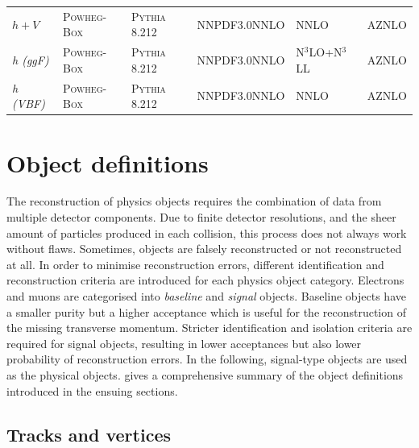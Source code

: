 \begin{table}
{\begin{tabular} {llllll}
	$h+V$ & \textsc{Powheg-Box} & \textsc{Pythia} 8.212 & NNPDF3.0NNLO & NNLO~\cite{deFlorian:2016spz} & AZNLO \\
	\textit{h (ggF)} & \textsc{Powheg-Box} & \textsc{Pythia} 8.212 & NNPDF3.0NNLO & N$^3$LO+N$^3$LL~\cite{deFlorian:2016spz} & AZNLO \\
	\textit{h (VBF)} & \textsc{Powheg-Box} & \textsc{Pythia} 8.212 & NNPDF3.0NNLO & NNLO~\cite{deFlorian:2016spz} & AZNLO \\
	\bottomrule
	\end{tabular}}\vspace{3mm}
	\label{tab:mc_generators}   
\end{table}

\section{Object definitions}\label{sec:object_definitions}

The reconstruction of physics objects requires the combination of data from multiple detector components. Due to finite detector resolutions, and the sheer amount of particles produced in each collision, this process does not always work without flaws. Sometimes, objects are falsely reconstructed or not reconstructed at all. In order to minimise reconstruction errors, different identification and reconstruction criteria are introduced for each physics object category. Electrons and muons are categorised into \textit{baseline} and \textit{signal} objects. Baseline objects have a smaller purity but a higher acceptance which is \eg useful for the reconstruction of the missing transverse momentum. Stricter identification and isolation criteria are required for signal objects, resulting in lower acceptances but also lower probability of reconstruction errors. In the following, signal-type objects are used as the physical objects.  gives a comprehensive summary of the object definitions introduced in the ensuing sections.

\subsection{Tracks and vertices}\label{sec:reco_tracks}

